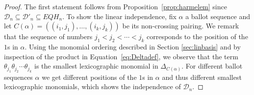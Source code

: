 \documentclass[11pt,oneside]{amsart}
\theoremstyle{definition}
\numberwithin{equation}{section}
\begin{document}
\begin{proof}
  The first statement follows from Proposition~\ref{prop:harmelem} since ${\mathcal D}_n \subseteq {\mathcal D}'_n \subseteq EQH_n$.
To show the linear independence, fix $\alpha$ a ballot sequence and let $C(\alpha)=((i_1,j_1),\ldots,(i_k,j_k))$ be its non-crossing pairing.  We remark that the sequence of numbers
$j_1<j_2<\cdots<j_k$ corresponds to the position of the $1$s in $\alpha$.
Using the monomial ordering described in Section \ref{sec:linbasis}
and by inspection of the product in Equation~\eqref{eq:Deltadef},
we observe that the term $\theta_{j_1}\theta_{j_2}\cdots\theta_{j_k}$ is the smallest lexicographic
monomial in $\Delta_{C(\alpha)}$.
For different ballot sequences $\alpha$ we get different positions of the $1$s in
$\alpha$ and thus different smallest lexicographic monomials,
which shows the independence of ${\mathcal D}_n$.
\end{proof}
\end{document}
